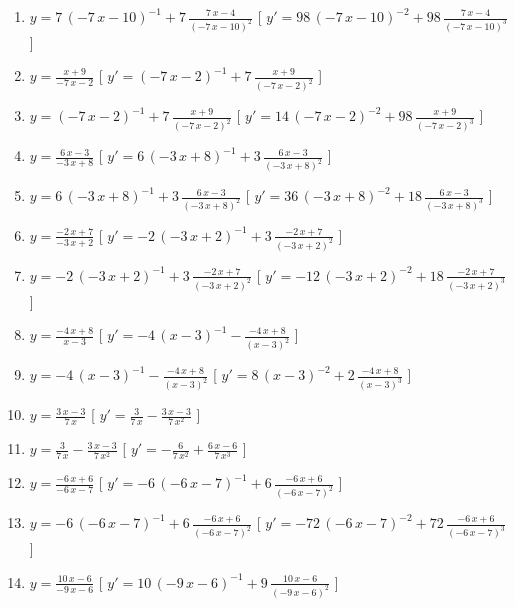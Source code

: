 \begin{esercizio}
\begin{enumerate}
\item $y= 7\, \left( -7\,x-10 \right) ^{-1}+7\,{\frac {7\,x-4}{ \left( -7\,x-10 \right) ^{2}}} $ \hfill [ $y'= 98\, \left( -7\,x-10 \right) ^{-2}+98\,{\frac {7\,x-4}{ \left( -7\,x-10 \right) ^{3}}}$ ]
\item $y= {\frac {x+9}{-7\,x-2}} $ \hfill [ $y'=  \left( -7\,x-2 \right) ^{-1}+7\,{\frac {x+9}{ \left( -7\,x-2 \right) ^{2}}}$ ]
\item $y=  \left( -7\,x-2 \right) ^{-1}+7\,{\frac {x+9}{ \left( -7\,x-2 \right) ^{2}}} $ \hfill [ $y'= 14\, \left( -7\,x-2 \right) ^{-2}+98\,{\frac {x+9}{ \left( -7\,x-2 \right) ^{3}}}$ ]
\item $y= {\frac {6\,x-3}{-3\,x+8}} $ \hfill [ $y'= 6\, \left( -3\,x+8 \right) ^{-1}+3\,{\frac {6\,x-3}{ \left( -3\,x+8 \right) ^{2}}}$ ]
\item $y= 6\, \left( -3\,x+8 \right) ^{-1}+3\,{\frac {6\,x-3}{ \left( -3\,x+8 \right) ^{2}}} $ \hfill [ $y'= 36\, \left( -3\,x+8 \right) ^{-2}+18\,{\frac {6\,x-3}{ \left( -3\,x+8 \right) ^{3}}}$ ]
\item $y= {\frac {-2\,x+7}{-3\,x+2}} $ \hfill [ $y'= -2\, \left( -3\,x+2 \right) ^{-1}+3\,{\frac {-2\,x+7}{ \left( -3\,x+2 \right) ^{2}}}$ ]
\item $y= -2\, \left( -3\,x+2 \right) ^{-1}+3\,{\frac {-2\,x+7}{ \left( -3\,x+2 \right) ^{2}}} $ \hfill [ $y'= -12\, \left( -3\,x+2 \right) ^{-2}+18\,{\frac {-2\,x+7}{ \left( -3\,x+2 \right) ^{3}}}$ ]
\item $y= {\frac {-4\,x+8}{x-3}} $ \hfill [ $y'= -4\, \left( x-3 \right) ^{-1}-{\frac {-4\,x+8}{ \left( x-3 \right) ^{2}}}$ ]
\item $y= -4\, \left( x-3 \right) ^{-1}-{\frac {-4\,x+8}{ \left( x-3 \right) ^{2}}} $ \hfill [ $y'= 8\, \left( x-3 \right) ^{-2}+2\,{\frac {-4\,x+8}{ \left( x-3 \right) ^{3}}}$ ]
\item $y= {\frac {3\,x-3}{7\,x}} $ \hfill [ $y'= {\frac {3}{7\,x}}-{\frac {3\,x-3}{7\,{x}^{2}}}$ ]
\item $y= {\frac {3}{7\,x}}-{\frac {3\,x-3}{7\,{x}^{2}}} $ \hfill [ $y'= -{\frac {6}{7\,{x}^{2}}}+{\frac {6\,x-6}{7\,{x}^{3}}}$ ]
\item $y= {\frac {-6\,x+6}{-6\,x-7}} $ \hfill [ $y'= -6\, \left( -6\,x-7 \right) ^{-1}+6\,{\frac {-6\,x+6}{ \left( -6\,x-7 \right) ^{2}}}$ ]
\item $y= -6\, \left( -6\,x-7 \right) ^{-1}+6\,{\frac {-6\,x+6}{ \left( -6\,x-7 \right) ^{2}}} $ \hfill [ $y'= -72\, \left( -6\,x-7 \right) ^{-2}+72\,{\frac {-6\,x+6}{ \left( -6\,x-7 \right) ^{3}}}$ ]
\item $y= {\frac {10\,x-6}{-9\,x-6}} $ \hfill [ $y'= 10\, \left( -9\,x-6 \right) ^{-1}+9\,{\frac {10\,x-6}{ \left( -9\,x-6 \right) ^{2}}}$ ]

\end{enumerate}
\end{esercizio}
